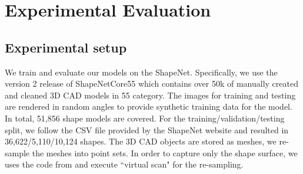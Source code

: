 \section{Experimental Evaluation}
\subsection{Experimental setup}
We train and evaluate our models on the ShapeNet\citep{shapenetdata}. Specifically, we use the version 2 release of ShapeNetCore55 which contains over 50k of
manually created and cleaned 3D CAD models in 55 category.
The images for training
and testing are rendered in random angles to provide synthetic training data for the model. In total,
51,856 shape models are covered. For the training/validation/testing split, we follow the CSV file provided by the ShapeNet website and resulted in 36,622/5,110/10,124 shapes. The 3D CAD objects are
stored as meshes, we re-sample the meshes into point sets. In order to capture only the shape surface, we uses the code from \citep{Wang-2017-OCNN} and execute ``virtual scan" for the re-sampling.
